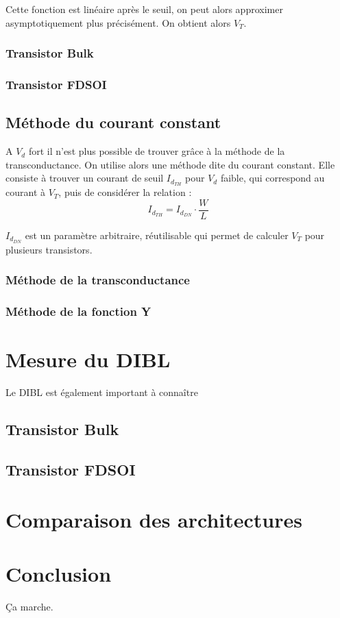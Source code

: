 \documentclass[a4paper,11pt]{report}
\begin{document}
Cette fonction est linéaire après le seuil, on peut alors approximer asymptotiquement plus précisément. On obtient alors $V_T$.
\subsection{Transistor Bulk}
\subsection{Transistor FDSOI}
\section{Méthode du courant constant}
A $V_d$ fort il n'est plus possible de trouver grâce à la méthode de la transconductance. On utilise alors une méthode dite du courant constant. Elle consiste à trouver un courant de seuil $I_{d_{TH}}$ pour $V_d$ faible, qui correspond au courant à $V_T$, puis de considérer la relation : \[I_{d_{TH}}=I_{d_{DN}}\cdot\dfrac{W}{L}\]

$I_{d_{DN}}$ est un paramètre arbitraire, réutilisable qui permet de calculer $V_T$ pour plusieurs transistors.


\subsection{Méthode de la transconductance}


\subsection{Méthode de la fonction Y}

\chapter{Mesure du DIBL}
Le DIBL est également important à connaître %
\section{Transistor Bulk}

\section{Transistor FDSOI}

\chapter{Comparaison des architectures}

\chapter*{Conclusion}

Ça marche. %
\end{document}
